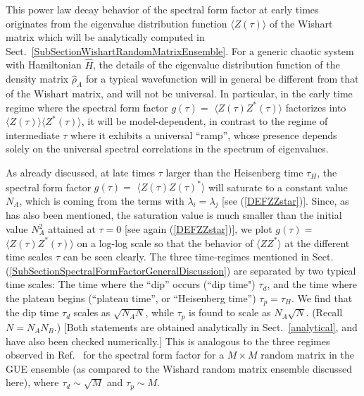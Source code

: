 \documentclass[aps,prb,preprint,onecolumn,amsmath,amssymb,superscriptaddress,eqsecnum,floatfix,scrartcl]{revtex4-1}
\begin{document}
This power law decay behavior of the spectral form factor at early times 
originates from the eigenvalue distribution function 
$\langle Z(\tau)\rangle$
of  the Wishart matrix which will be analytically computed in Sect.~\ref{SubSectionWishartRandomMatrixEnsemble}.
For a generic chaotic system with Hamiltonian ${\hat H}$, the 
details of the eigenvalue 
distribution function 
of  the density matrix ${\hat \rho}_A$ for a typical wavefunction
will in general be different from that of the Wishart matrix, and will
not be universal.
In particular,  in the
early time regime where the spectral  form factor $g(\tau)=$  $\langle Z(\tau)Z^*(\tau)\rangle$ factorizes into
$\langle Z(\tau)\rangle \langle Z^*(\tau)\rangle$, it  will be 
model-dependent,
in contrast to the regime of  intermediate  $\tau$
where it exhibits
a  universal ``ramp'', whose presence depends solely  on the universal
spectral 
correlations in  the spectrum of eigenvalues.




As already discussed,
at  late times $\tau$ larger than the Heisenberg time $\tau_H$,  the spectral form factor $g(\tau)=$  $\langle Z(\tau)Z(\tau)^*\rangle$ will saturate to a constant value $N_A$, which is coming from the terms with  $\lambda_i=\lambda_j$
[see (\ref{DEFZZstar})].
 Since, as  has also been  mentioned,  the saturation value is much smaller than the initial value $N_A^2$ attained at $\tau=0$ [see again (\ref{DEFZZstar})], 
we plot  $g(\tau)=$  $\langle Z(\tau)Z^*(\tau)\rangle$ on a log-log scale so that the behavior of $\langle ZZ^*\rangle$
at the different time scales $\tau$
can be seen clearly. 
The 
three time-regimes
mentioned in Sect.
(\ref{SubSectionSpectralFormFactorGeneralDiscussion})
are separated by two typical time scales:
The time where the ``dip'' occurs (``dip time") $\tau_d$, and the 
time where the plateau begins (``plateau time'', or ``Heisenberg time'') $\tau_p=\tau_H$.
We find that the
 dip time $\tau_d$
scales
 as $\sqrt{N_A N}$,
 while $\tau_p$
is found to scale as $N_A\sqrt{N}$. (Recall $N=N_A N_B$.)
  [Both statements are obtained analytically in Sect.~\ref{analytical}, and have also been checked
numerically.]
This is analogous to the three regimes  observed in Ref.\  for  the spectral form factor for a $M \times M$  random matrix in the GUE ensemble (as compared
to the Wishard random matrix ensemble discussed here),  where  $\tau_d\sim \sqrt{M}$ and $\tau_p\sim M$.
\end{document}
